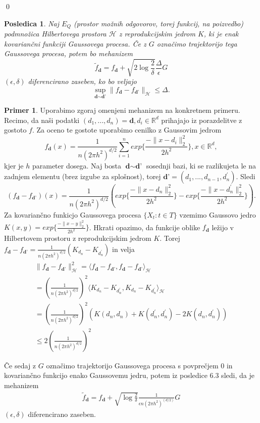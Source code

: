 \documentclass[12pt,a4paper]{amsart}
\theoremstyle{definition} %
\newtheorem{primer}[definicija]{Primer}
\theoremstyle{plain} %
\newtheorem{posledica}[definicija]{Posledica}
\begin{document}
\qed
\begin{posledica}
Naj $E_Q$ (prostor možnih odgovorov, torej funkcij, na poizvedbo) podmnožica Hilbertovega prostora $\mathcal{H}$ z reprodukcijskim jedrom $K$, ki je enak kovariančni funkciji Gaussovega procesa. Če z $G$ označimo trajektorijo tega Gaussovega procesa, potem bo mehanizem 
$$
\widetilde{f}_{\textbf{d}} = f_{\textbf{d}} + \sqrt{2\log{\frac{2}{\delta}}} \frac{\Delta}{\epsilon}G
$$
$(\epsilon,\delta)$ diferencirano zaseben, ko bo veljajo 
$$
\sup_{\textbf{d} \sim \textbf{d'}} \| f_{\textbf{d}} -  f_{\textbf{d'}} \|_{\mathcal{H}} \leq \Delta.
$$
\end{posledica}
 
\begin{primer}
Uporabimo zgoraj omenjeni mehanizem na konkretnem primeru. Recimo, da naši podatki $(d_1,...,d_n) = \textbf{d}, d_i \in \mathbb{R}^d$ prihajajo iz porazdelitve z gostoto $f$. Za oceno te gostote uporabimo cenilko z Gaussovim jedrom
$$
f_{\textbf{d}}(x) = \frac{1}{n(2\pi h^2)^{d/2}} \sum_{i=1}^{n} exp\{\frac{-\|x-d_i\|_{2}^{2}}{2h^2}\},  x \in \mathbb{R}^d,
$$
kjer je $h$ parameter dosega. Naj bosta $\textbf{d} \sim \textbf{d'}$ sosednji bazi, ki se razlikujeta le na zadnjem elementu (brez izgube za splošnost), torej $\textbf{d'} = (d_1,...,d_{n-1},d_{n}^{\prime}) $. Sledi
$$
(f_{\textbf{d}} - f_{\textbf{d'}})(x) = \frac{1}{n(2\pi h^2)^{d/2}} (exp\{\frac{-\|x-d_n\|_{2}^{2}}{2h^2}\}-exp\{\frac{-\|x-d_{n}^{\prime}\|_{2}^{2}}{2h^2}\}).
$$
Za kovariančno funkicjo Gaussovega procesa $\{X_t : t \in T \}$ vzemimo Gaussovo jedro $K(x,y) = exp\{\frac{-\|x-y\|_{2}^{2}}{2h^2}\}$. Hkrati opazimo, da funkcije oblike $f_{\textbf{d}}$ ležijo v Hilbertovem prostoru z reprodukcijskim jedrom $K$. Torej $f_{\textbf{d}} - f_{\textbf{d'}} = \frac{1}{n(2\pi h^2)^{d/2}} (K_{d_n}-K_{d_{n}^{\prime}})$ in velja 
\begin{gather*}
\|f_{\textbf{d}} - f_{\textbf{d'}}\|_{\mathcal{H}}^{2} = \langle f_{\textbf{d}} - f_{\textbf{d'}}, f_{\textbf{d}} - f_{\textbf{d'}} \rangle_{\mathcal{H}}  \\ 
= (\frac{1}{n(2\pi h^2)^{d/2}})^2 \langle K_{d_n}-K_{d_{n}^{\prime}}, K_{d_n}-K_{d_{n}^{\prime}} \rangle_{\mathcal{H}}  \\
= (\frac{1}{n(2\pi h^2)^{d/2}})^2 (K(d_n, d_n)+K(d_{n}^{\prime}, d_{n}^{\prime})-2K(d_n, d_{n}^{\prime})) \\ 
\leq 2 (\frac{1}{n(2\pi h^2)^{d/2}})^2
\end{gather*}

Če sedaj z $G$ označimo trajektorijo Gaussovega procesa s povprečjem 0 in kovariančno funkcijo enako Gaussovemu jedru, potem iz posledice 6.3 sledi, da je mehanizem 
\begin{gather*}
\widetilde{f}_{\textbf{d}} = f_{\textbf{d}} + \sqrt{\log{\frac{2}{\delta}}} \frac{1}{\epsilon n (2\pi h^2)^{(d/2)}}G
\end{gather*}
$(\epsilon, \delta)$ diferencirano zaseben.
\end{primer}
\end{document}
